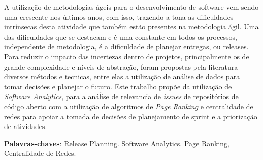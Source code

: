 \begin{resumo}
 A utilização de metodologias ágeis para o desenvolvimento de software vem sendo
 uma crescente nos últimos anos, com isso, trazendo a tona as dificuldades intrínsecas 
 desta atividade que também estão presentes na metodologia ágil. Uma das
 dificuldades que se destacam e é uma constante em todos os processos, independente
 de metodologia, é a dificuldade de planejar entregas, ou releases. Para reduzir o
 impacto das incertezas dentro de projetos, principalmente os de grande complexidade
 e níveis de abstração, foram propostas pela literatura diversos métodos e tecnicas,
 entre elas a utilização de análise de dados para tomar decisões e planejar o futuro.
 Este trabalho propõe da utilização de \textit{Software Analytics}, para a anáĺise de
 relevancia de \textit{issues} de repositórios de código aberto com a utilização de
 algoritmos de \textit{Page Ranking} e centralidade de redes para apoiar a tomada
 de decisões de planejamento de sprint e a priorização de atividades.
 \vspace{\onelineskip}
    
 \noindent
 \textbf{Palavras-chaves}: Release Planning. Software Analytics. Page Ranking, Centralidade de Redes.
\end{resumo}
